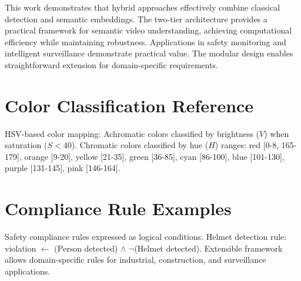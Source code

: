 \documentclass[12pt,a4paper]{article}
\begin{document}
This work demonstrates that hybrid approaches effectively combine classical detection and semantic embeddings. The two-tier architecture provides a practical framework for semantic video understanding, achieving computational efficiency while maintaining robustness. Applications in safety monitoring and intelligent surveillance demonstrate practical value. The modular design enables straightforward extension for domain-specific requirements.

\appendix

\section{Color Classification Reference}

HSV-based color mapping: Achromatic colors classified by brightness ($V$) when saturation ($S < 40$). Chromatic colors classified by hue ($H$) ranges: red [0-8, 165-179], orange [9-20], yellow [21-35], green [36-85], cyan [86-100], blue [101-130], purple [131-145], pink [146-164].

\section{Compliance Rule Examples}

Safety compliance rules expressed as logical conditions. Helmet detection rule: violation $\leftarrow$ (Person detected) $\wedge$ $\neg$(Helmet detected). Extensible framework allows domain-specific rules for industrial, construction, and surveillance applications.
\end{document}
